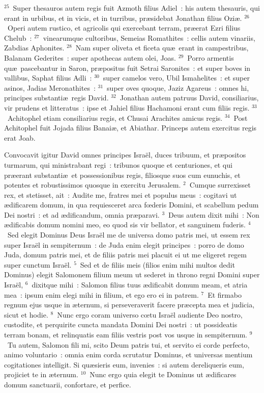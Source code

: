 ${}^{25}$~Super thesauros autem regis fuit Azmoth filius Adiel~: his autem thesauris, qui erant in urbibus, et in vicis, et in turribus, pr\ae sidebat Jonathan filius Ozi\ae .
${}^{26}$~Operi autem rustico, et agricolis qui exercebant terram, pr\ae erat Ezri filius Chelub~:
${}^{27}$~vinearumque cultoribus, Semeias Romathites~: cellis autem vinariis, Zabdias Aphonites.
${}^{28}$~Nam super oliveta et ficeta qu\ae\ erant in campestribus, Balanam Gederites~: super apothecas autem olei, Joas.
${}^{29}$~Porro armentis qu\ae\ pascebantur in Saron, pr\ae positus fuit Setrai Saronites~: et super boves in vallibus, Saphat filius Adli~:
${}^{30}$~super camelos vero, Ubil Ismahelites~: et super asinos, Jadias Meronathites~:
${}^{31}$~super oves quoque, Jaziz Agareus~: omnes hi, principes substanti\ae\ regis David.
${}^{32}$~Jonathan autem patruus David, consiliarius, vir prudens et litteratus~: ipse et Jahiel filius Hachamoni erant cum filiis regis.
${}^{33}$~Achitophel etiam consiliarius regis, et Chusai Arachites amicus regis.
${}^{34}$~Post Achitophel fuit Jojada filius Banai\ae , et Abiathar. Princeps autem exercitus regis erat Joab.

\bchapter
\lettrine[lines=3,image=true,loversize=0.05,lraise=-0.03]{C}{}onvocavit igitur David omnes principes Isra\"el, duces tribuum, et pr\ae positos turmarum, qui ministrabant regi~: tribunos quoque et centuriones, et qui pr\ae erant substanti\ae\ et possessionibus regis, filiosque suos cum eunuchis, et potentes et robustissimos quosque in exercitu Jerusalem.
${}^{2}$~Cumque surrexisset rex, et stetisset, ait~: Audite me, fratres mei et populus meus~: cogitavi ut \ae dificarem domum, in qua requiesceret arca fœderis Domini, et scabellum pedum Dei nostri~: et ad \ae dificandum, omnia pr\ae paravi.
${}^{3}$~Deus autem dixit mihi~: Non \ae dificabis domum nomini meo, eo quod sis vir bellator, et sanguinem fuderis.
${}^{4}$~Sed elegit Dominus Deus Isra\"el me de universa domo patris mei, ut essem rex super Isra\"el in sempiternum~: de Juda enim elegit principes~: porro de domo Juda, domum patris mei, et de filiis patris mei placuit ei ut me eligeret regem super cunctum Isra\"el.
${}^{5}$~Sed et de filiis meis (filios enim mihi multos dedit Dominus) elegit Salomonem filium meum ut sederet in throno regni Domini super Isra\"el,
${}^{6}$~dixitque mihi~: Salomon filius tuus \ae dificabit domum meam, et atria mea~: ipsum enim elegi mihi in filium, et ego ero ei in patrem.
${}^{7}$~Et firmabo regnum ejus usque in \ae ternum, si perseveraverit facere pr\ae cepta mea et judicia, sicut et hodie.
${}^{8}$~Nunc ergo coram universo cœtu Isra\"el audiente Deo nostro, custodite, et perquirite cuncta mandata Domini Dei nostri~: ut possideatis terram bonam, et relinquatis eam filiis vestris post vos usque in sempiternum.
${}^{9}$~Tu autem, Salomon fili mi, scito Deum patris tui, et servito ei corde perfecto, animo voluntario~: omnia enim corda scrutatur Dominus, et universas mentium cogitationes intelligit. Si qu\ae sieris eum, invenies~: si autem dereliqueris eum, projiciet te in \ae ternum.
${}^{10}$~Nunc ergo quia elegit te Dominus ut \ae dificares domum sanctuarii, confortare, et perfice.


